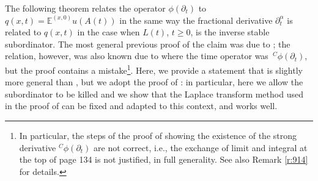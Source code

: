 \documentclass[reqno]{amsart}
\theoremstyle{remark}
\numberwithin{equation}{section} %
\newcommand{\1}{\mathds{1}}
\begin{document}
	The following theorem relates the operator $\phi(\partial_t)$ to $q(x,t)=\mathds{E}^{(x,0)}u(A(t))$ in the same way the fractional derivative $\partial^\alpha_t$ is related to $q(x,t)$ in the case when $L(t)$, $t\ge0$, is the inverse stable subordinator. The most general previous proof of the claim was due to \cite{chen}; the relation, however, was also known due to \cite[Theorem 5.1]{toaldo_pota} where the time operator was $\,^C\phi(\partial_t)$, but the proof contains a mistake\footnote{In particular, the steps of the proof of \cite[Theorem 5.1]{toaldo_pota} showing the existence of the strong derivative $^C\phi(\partial_t)$ are not correct, i.e., the exchange of limit and integral at the top of page 134 is not justified, in full generality. See also Remark \ref{r:914} for details.}. Here, we provide a statement that is slightly more general than \cite{chen}, but we adopt the proof of \cite{toaldo_pota}: in particular, here we allow the subordinator to be killed and we show that the Laplace transform method used in the proof of \cite[Theorem 5.1]{toaldo_pota} can be fixed and adapted to this context, and works well.
\end{document}

